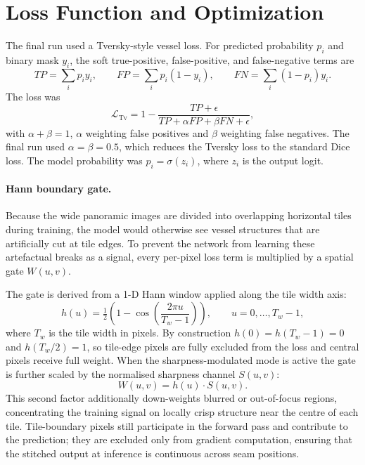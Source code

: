 \documentclass[11pt,letterpaper]{article}
\begin{document}
\section{Loss Function and Optimization}
The final run used a Tversky-style vessel loss. For predicted probability $p_i$ and binary mask $y_i$, the soft true-positive, false-positive, and false-negative terms are
\begin{equation}
TP=\sum_i p_i y_i,\qquad FP=\sum_i p_i(1-y_i),\qquad FN=\sum_i (1-p_i)y_i.
\end{equation}
The loss was
\begin{equation}
\mathcal{L}_{\mathrm{Tv}} = 1 - \frac{TP+\epsilon}{TP+\alpha FP+\beta FN+\epsilon},
\end{equation}
with $\alpha + \beta = 1$, $\alpha$ weighting false positives and $\beta$ weighting false negatives. The final run used $\alpha=\beta=0.5$, which reduces the Tversky loss to the standard Dice loss. The model probability was $p_i=\sigma(z_i)$, where $z_i$ is the output logit.

\paragraph{Hann boundary gate.}
Because the wide panoramic images are divided into overlapping horizontal tiles during training, the model would otherwise see vessel structures that are artificially cut at tile edges. To prevent the network from learning these artefactual breaks as a signal, every per-pixel loss term is multiplied by a spatial gate $W(u,v)$.

The gate is derived from a 1-D Hann window applied along the tile width axis:
\begin{equation}
  h(u) = \tfrac{1}{2}\!\left(1 - \cos\!\left(\frac{2\pi u}{T_w - 1}\right)\right), \qquad u = 0,\ldots,T_w-1,
\end{equation}
where $T_w$ is the tile width in pixels. By construction $h(0)=h(T_w-1)=0$ and $h(T_w/2)=1$, so tile-edge pixels are fully excluded from the loss and central pixels receive full weight. When the sharpness-modulated mode is active the gate is further scaled by the normalised sharpness channel $S(u,v)$:
\begin{equation}
  W(u,v) = h(u)\cdot S(u,v).
\end{equation}
This second factor additionally down-weights blurred or out-of-focus regions, concentrating the training signal on locally crisp structure near the centre of each tile. Tile-boundary pixels still participate in the forward pass and contribute to the prediction; they are excluded only from gradient computation, ensuring that the stitched output at inference is continuous across seam positions.
\end{document}
